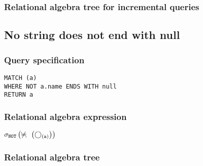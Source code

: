 \subsubsection*{Relational algebra tree for incremental queries}


\subsection{No string does not end with null}

\subsubsection*{Query specification}

\begin{lstlisting}
MATCH (a)
WHERE NOT a.name ENDS WITH null
RETURN a
\end{lstlisting}

\subsubsection*{Relational algebra expression}

$\selection{\mathtt{NOT}} \left(\alldifferent{} \left(\getvertices{a}{}\right)\right)$

\subsubsection*{Relational algebra tree}


